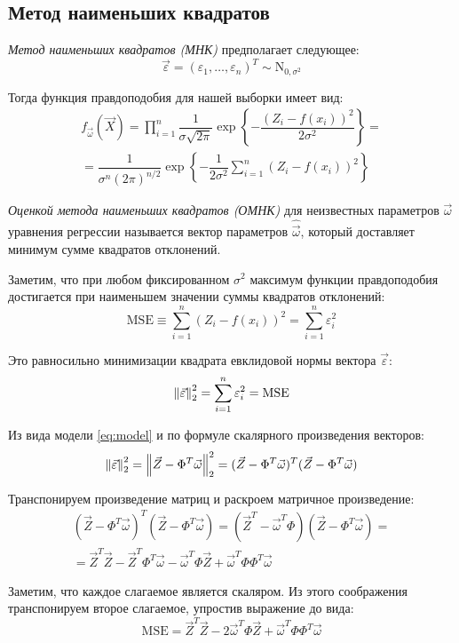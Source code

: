 \subsection{Метод наименьших квадратов}

\textit{Метод наименьших квадратов (МНК)} предполагает следующее:
\[
    \vec{\varepsilon}=(\varepsilon_1,\dots,\varepsilon_n)^T\sim \textrm{N}_{0,\sigma^2}
\]

Тогда функция правдоподобия для нашей выборки имеет вид:
\[
    \begin{gathered}
    f_{\vec{\omega}}(\vec{X})=\prod_{i=1}^n\dfrac{1}{\sigma\sqrt{2\pi}}\exp\left\{-\dfrac{(Z_i-f(x_i))^2}{2\sigma^2}\right\}=\\
    =\dfrac{1}{\sigma^n(2\pi)^{n\slash 2}}\exp\left\{-\dfrac{1}{2\sigma^2}\sum_{i=1}^n(Z_i-f(x_i))^2\right\}
    \end{gathered}
\]

\textit{Оценкой метода наименьших квадратов (ОМНК)} для неизвестных параметров \( \vec{\omega} \) уравнения регрессии называется вектор параметров $\hat{\vec{\omega}}$, который доставляет минимум сумме квадратов отклонений.

Заметим, что при любом фиксированном \( \sigma^2 \) максимум функции правдоподобия достигается при наименьшем значении суммы квадратов отклонений:
\[
    \textrm{MSE}\equiv \sum_{i=1}^n(Z_i-f(x_i))^2=\sum_{i=1}^n\varepsilon^2_i
\]

Это равносильно минимизации квадрата евклидовой нормы вектора \( \vec{\varepsilon} \):
\[
    \left\lVert\vec{\varepsilon}\right\rVert_2^2=\sum_{i=1}^n\varepsilon^2_i=\textrm{MSE}
\]

Из вида модели \eqref{eq:model} и по формуле скалярного произведения векторов:
\[
    \left\lVert\vec{\varepsilon}\right\rVert^2_2=\left\lVert\vec{Z}-\Phi^T\vec{\omega}\right\rVert^2_2=(\vec{Z}-\Phi^T\vec{\omega})^T(\vec{Z}-\Phi^T\vec{\omega})
\]

Транспонируем произведение матриц и раскроем матричное произведение:
\[
    \begin{gathered}
    (\vec{Z}-\Phi^T\vec{\omega})^T(\vec{Z}-\Phi^T\vec{\omega})=(\vec{Z}^T-\vec{\omega}^T\Phi)(\vec{Z}-\Phi^T\vec{\omega})=\\
    =\vec{Z}^T\vec{Z}-\vec{Z}^T\Phi^T\vec{\omega}-\vec{\omega}^T\Phi\vec{Z}+\vec{\omega}^T\Phi\Phi^T\vec{\omega}
    \end{gathered}
\]

Заметим, что каждое слагаемое является скаляром. Из этого соображения транспонируем второе слагаемое, упростив выражение до вида:
\[
    \textrm{MSE}=\vec{Z}^T\vec{Z}-2\vec{\omega}^T\Phi\vec{Z}+\vec{\omega}^T\Phi\Phi^T\vec{\omega}
\]

